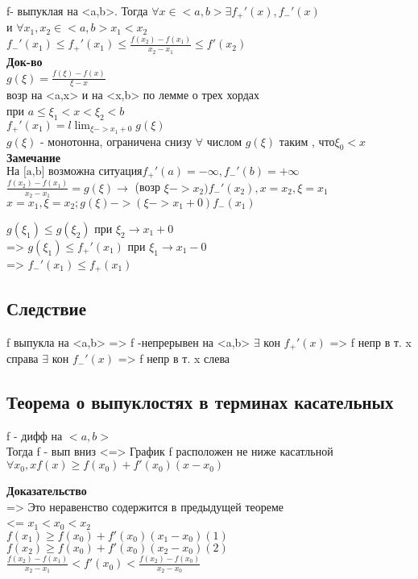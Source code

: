 \documentclass[12pt, a4paper]{article}
\newcommand{\nl}{\newline}
\begin{document}
   f- выпуклая на <a,b>. Тогда $\forall x \in <a,b> \exists f_{+}'(x) , f_{-}'(x)$ \\
   и $\forall x_{1}, x_{2} \in <a,b> x_{1}<x_{2}$ \\
   $f_{-}'(x_{1}) \leq f_{+}'(x_{1}) \leq \frac{f(x_2)-f(x_1)}{x_2-x_1}\leq f'(x_2)$ \\
 \textbf{Док-во} \\
   $g(\xi)=\frac{f(\xi)-f(x)}{\xi-x}$ \\ возр на <a,x> и на <x,b>  по лемме о трех хордах \\
   при $a\leq\xi_{1} < x<\xi_{2} < b $\\
 $ f_{+}'(x_{1})=l\lim_{\xi -> x_{1}+0}g(\xi) $\\
   $g(\xi)$ - монотонна, ограничена снизу  $\forall$ числом $g(\xi)$ таким , что$ \xi_0<x$ \\
 \textbf{Замечание} \\
  $ \text{На [a,b] возможна ситуация}  f_{+}'(a)= -\infty, f_{-}'(b)=+\infty$ \\
  $ \frac{f(x_2)-f(x_1)}{x_2-x_1} =g(\xi) \rightarrow $ (возр $ \xi -> x_{2}) f_{-}'(x_{2}) , x=x_{2}, \xi=x_{1} $\\
   $x=x_1, \xi=x_2 ; g(\xi) ->(\xi -> x_1 + 0) f_-(x_1)$ \nl
  
  $g(\xi_{1}) \leq g(\xi_{2})$ при $\xi_{2} \rightarrow x_1 + 0$ \\
 => $g(\xi_{1}) \leq f_{+}'(x_{1})$ при $\xi_1 \rightarrow x_1 - 0$ \\
 => $f_{-}'(x_1)  \leq f_{+}(x_{1})$  \\
 
\subsection{Следствие} 
   f выпукла на <a,b> => f -непрерывен на <a,b> \nl
   $\exists$ кон  $f_{+}'(x)$ => f непр в т. x справа \nl
   $\exists$ кон  $f_{-}'(x)$ => f непр в т. x слева \nl
 
\subsection{Теорема о выпуклостях в терминах касательных}
   f - дифф на $<a,b>$ 	\\
   Тогда f - вып вниз <=> График  f расположен не ниже касатльной \\
   $\forall x_{0},x f(x) \geq f(x_{0}) +f'(x_{0})(x-x_{0})$ \nl
   
\textbf{Доказательство} \\
   => Это неравенство содержится в предыдущей теореме \\
   <= $x_{1}< x_{0} < x_{2}$ \\
  $ f(x_{1})\geq f(x_{0})+f'(x_{0})(x_{1}-x_{0}) (1)$ \\
   $f(x_{2})\geq f(x_{0})+f'(x_{0})(x_{2}-x_{0}) (2)$ \\
    $\frac{f(x_2)-f(x_1)}{x_2-x_1} <f'(x_0)<\frac{f(x_2)-f(x_0)}{x_2-x_0}$   \\
 
\end{document}
